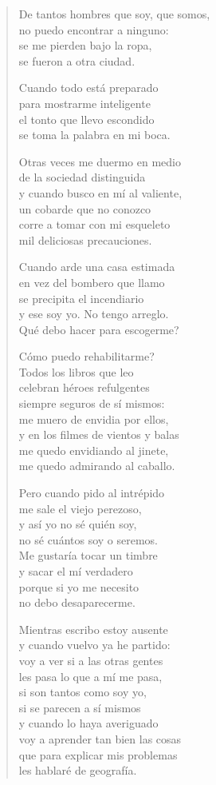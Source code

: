 \documentclass[12pt]{article}
\begin{document}
\clearpage
{}
\begin{verse}

De tantos hombres que soy, que somos,\\
no puedo encontrar a ninguno:\\
se me pierden bajo la ropa,\\
se fueron a otra ciudad.  

Cuando todo está preparado\\
para mostrarme inteligente\\
el tonto que llevo escondido\\
se toma la palabra en mi boca.  

Otras veces me duermo en medio\\
de la sociedad distinguida\\
y cuando busco en mí al valiente,\\
un cobarde que no conozco\\
corre a tomar con mi esqueleto\\
mil deliciosas precauciones.  

Cuando arde una casa estimada\\
en vez del bombero que llamo\\
se precipita el incendiario\\
y ese soy yo. No tengo arreglo.\\
Qué debo hacer para escogerme?  

Cómo puedo rehabilitarme?\\
Todos los libros que leo\\
celebran héroes refulgentes\\
siempre seguros de sí mismos:\\
me muero de envidia por ellos,\\
y en los filmes de vientos y balas\\
me quedo envidiando al jinete,\\
me quedo admirando al caballo.  

Pero cuando pido al intrépido\\
me sale el viejo perezoso,\\
y así yo no sé quién soy,\\
no sé cuántos soy o seremos.\\
Me gustaría tocar un timbre\\
y sacar el mí verdadero\\
porque si yo me necesito\\
no debo desaparecerme.  

Mientras escribo estoy ausente\\
y cuando vuelvo ya he partido:\\
voy a ver si a las otras gentes\\
les pasa lo que a mí me pasa,\\
si son tantos como soy yo,\\
si se parecen a sí mismos\\
y cuando lo haya averiguado\\
voy a aprender tan bien las cosas\\
que para explicar mis problemas\\
les hablaré de geografía.
\end{verse}
\end{document}

